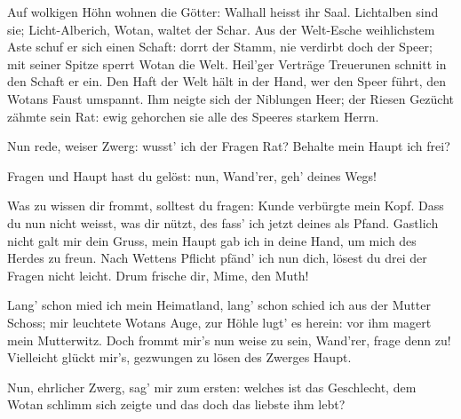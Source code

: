 \begin{drama}
\Wandererspeaks

Auf wolkigen Höhn
wohnen die Götter:
Walhall heisst ihr Saal.
Lichtalben sind sie;
Licht-Alberich,
Wotan, waltet der Schar.
Aus der Welt-Esche
weihlichstem Aste
schuf er sich einen Schaft:
dorrt der Stamm,
nie verdirbt doch der Speer;
mit seiner Spitze
sperrt Wotan die Welt.
Heil'ger Verträge
Treuerunen
schnitt in den Schaft er ein.
Den Haft der Welt
hält in der Hand,
wer den Speer führt,
den Wotans Faust umspannt.
Ihm neigte sich
der Niblungen Heer;
der Riesen Gezücht
zähmte sein Rat:
ewig gehorchen sie alle
des Speeres starkem Herrn.


Nun rede, weiser Zwerg:
wusst' ich der Fragen Rat?
Behalte mein Haupt ich frei?

\Mimespeaks


Fragen und Haupt
hast du gelöst:
nun, Wand'rer, geh' deines Wegs!

\Wandererspeaks

Was zu wissen dir frommt,
solltest du fragen:
Kunde verbürgte mein Kopf.
Dass du nun nicht weisst,
was dir nützt,
des fass' ich jetzt deines als Pfand.
Gastlich nicht
galt mir dein Gruss,
mein Haupt gab ich
in deine Hand,
um mich des Herdes zu freun.
Nach Wettens Pflicht
pfänd' ich nun dich,
lösest du drei
der Fragen nicht leicht.
Drum frische dir, Mime, den Muth!

\Mimespeaks


Lang' schon mied ich
mein Heimatland,
lang' schon schied ich
aus der Mutter Schoss;
mir leuchtete Wotans Auge,
zur Höhle lugt' es herein:
vor ihm magert
mein Mutterwitz.
Doch frommt mir's nun weise zu sein,
Wand'rer, frage denn zu!
Vielleicht glückt mir's, gezwungen
zu lösen des Zwerges Haupt.

\Wandererspeaks


Nun, ehrlicher Zwerg,
sag' mir zum ersten:
welches ist das Geschlecht,
dem Wotan schlimm sich zeigte
und das doch das liebste ihm lebt?


\end{drama}
